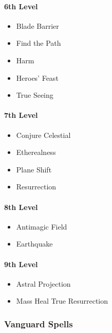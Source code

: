 \paragraph{6th Level}\label{_6th_level}

\begin{itemize}
\item
  Blade Barrier
\item
  Find the Path
\item
  Harm
\item
  Heroes' Feast
\item
  True Seeing
\end{itemize}

\paragraph{7th Level}\label{_7th_level}

\begin{itemize}
\item
  Conjure Celestial
\item
  Etherealness
\item
  Plane Shift
\item
  Resurrection
\end{itemize}

\paragraph{8th Level}\label{_8th_level}

\begin{itemize}
\item
  Antimagic Field
\item
  Earthquake
\end{itemize}

\paragraph{9th Level}\label{_9th_level}

\begin{itemize}
\item
  Astral Projection
\item
  Mass Heal True Resurrection
\end{itemize}

\subsubsection{Vanguard Spells}\label{spell-list-vanguard}

